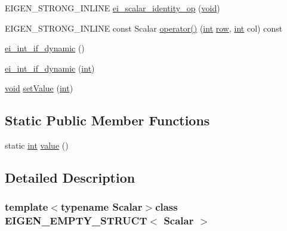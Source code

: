 \begin{DoxyCompactItemize}
\item 
E\-I\-G\-E\-N\-\_\-\-S\-T\-R\-O\-N\-G\-\_\-\-I\-N\-L\-I\-N\-E \hyperlink{struct_e_i_g_e_n___e_m_p_t_y___s_t_r_u_c_t_aaba2775fadc24abbb034ee030de422b4}{ei\-\_\-scalar\-\_\-identity\-\_\-op} (\hyperlink{group___u_a_v_objects_plugin_ga444cf2ff3f0ecbe028adce838d373f5c}{void})
\item 
E\-I\-G\-E\-N\-\_\-\-S\-T\-R\-O\-N\-G\-\_\-\-I\-N\-L\-I\-N\-E const Scalar \hyperlink{struct_e_i_g_e_n___e_m_p_t_y___s_t_r_u_c_t_a78f3ba8a35e1dfbce0b96a8d58b30941}{operator()} (\hyperlink{ioapi_8h_a787fa3cf048117ba7123753c1e74fcd6}{int} \hyperlink{glext_8h_a11b277b422822f784ee248b43eee3e1e}{row}, \hyperlink{ioapi_8h_a787fa3cf048117ba7123753c1e74fcd6}{int} col) const 
\item 
\hyperlink{struct_e_i_g_e_n___e_m_p_t_y___s_t_r_u_c_t_af69b145279b778ce3825d5a5d57fa337}{ei\-\_\-int\-\_\-if\-\_\-dynamic} ()
\item 
\hyperlink{struct_e_i_g_e_n___e_m_p_t_y___s_t_r_u_c_t_a81a4a17606d4b777b93be57ba2ddff87}{ei\-\_\-int\-\_\-if\-\_\-dynamic} (\hyperlink{ioapi_8h_a787fa3cf048117ba7123753c1e74fcd6}{int})
\item 
\hyperlink{group___u_a_v_objects_plugin_ga444cf2ff3f0ecbe028adce838d373f5c}{void} \hyperlink{struct_e_i_g_e_n___e_m_p_t_y___s_t_r_u_c_t_a5d8480b1e04da6b01c7b60ef57ff1aab}{set\-Value} (\hyperlink{ioapi_8h_a787fa3cf048117ba7123753c1e74fcd6}{int})
\end{DoxyCompactItemize}
\subsection*{Static Public Member Functions}
\begin{DoxyCompactItemize}
\item 
static \hyperlink{ioapi_8h_a787fa3cf048117ba7123753c1e74fcd6}{int} \hyperlink{struct_e_i_g_e_n___e_m_p_t_y___s_t_r_u_c_t_ab0dc6407aff1faa0c9cb99877d020c1d}{value} ()
\end{DoxyCompactItemize}


\subsection{Detailed Description}
\subsubsection*{template$<$typename Scalar$>$class E\-I\-G\-E\-N\-\_\-\-E\-M\-P\-T\-Y\-\_\-\-S\-T\-R\-U\-C\-T$<$ Scalar $>$}



